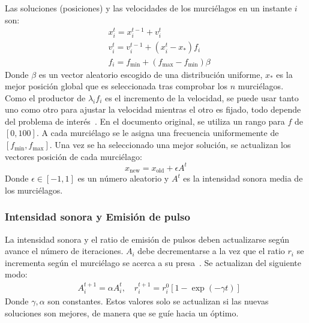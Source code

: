 Las soluciones (posiciones) y las velocidades de los murciélagos en un instante $i$ son:
\begin{equation}
    \begin{aligned}
         & x_i^t = x_i^{t-1} + v_i^t                                      \\
         & v_i^t = v_i^{t-1} + (x_i^t - x_*) f_i                          \\
         & f_i = f_{\text{min}} + (f_{\text{max}} - f_{\text{min}}) \beta
    \end{aligned}
\end{equation}
Donde $\beta$ es un vector aleatorio escogido de una distribución uniforme, $x_*$ es la mejor posición global que es seleccionada tras comprobar los $n$ murciélagos. Como el productor de $\lambda_i f_i$ es el incremento de la velocidad, se puede usar tanto uno como otro para ajustar la velocidad mientras el otro es fijado, todo depende del problema de interés~\cite{yang_new_2010}. En el documento original, se utiliza un rango para $f$ de $[0,100]$. A cada murciélago se le asigna una frecuencia uniformemente de $[f_{\text{min}},f_{\text{max}}]$. Una vez se ha seleccionado una mejor solución, se actualizan los vectores posición de cada murciélago:
\begin{equation}
    x_{\text{new}} = x_{\text{old}} + \epsilon A^t
\end{equation}
Donde $\epsilon \in [-1,1]$ es un número aleatorio y $A^t$ es la intensidad sonora media de los murciélagos.

\subsubsection{Intensidad sonora y Emisión de pulso}

La intensidad sonora y el ratio de emisión de pulsos deben actualizarse según avance el número de iteraciones. $A_i$ debe decrementarse a la vez que el ratio $r_i$ se incrementa según el murciélago se acerca a su presa~\cite{yang_new_2010}. Se actualizan del siguiente modo:
\begin{equation}
    \begin{aligned}
         & A_i^{t+1} = \alpha A_i^t, \quad r_i^{t+1} = r_i^0 [1 - \exp(-\gamma t)]
    \end{aligned}
\end{equation}
Donde $\gamma, \alpha$ son constantes. Estos valores solo se actualizan si las nuevas soluciones son mejores, de manera que se guíe hacia un óptimo.

